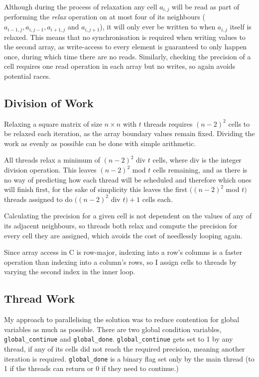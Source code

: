 \documentclass[12pt]{article}
\begin{document}
Although during the process of relaxation any cell $a_{i,j}$ will be read as part of performing the \textit{relax} operation on at most four of its neighbours ($a_{i-1,j}, a_{i,j-1}, a_{i+1, j}$ and $a_{i,j+1}$), it will only ever be written to when $a_{i,j}$ itself is relaxed. This means that no synchronisation is required when writing values to the second array, as write-access to every element is guaranteed to only happen once, during which time there are no reads. Similarly, checking the precision of a cell requires one read operation in each array but no writes, so again avoids potential races.

\subsection{Division of Work}

Relaxing a square matrix of size $n \times n$ with $t$ threads requires $(n-2)^2$ cells to be relaxed each iteration, as the array boundary values remain fixed. Dividing the work as evenly as possible can be done with simple arithmetic.

All threads relax a minimum of $(n-2)^2$ div $t$ cells, where div is the integer division operation. This leaves $(n-2)^2$ mod $t$ cells remaining, and as there is no way of predicting how each thread will be scheduled and therefore which ones will finish first, for the sake of simplicity this leaves the first $((n-2)^2$ mod $t)$ threads assigned to do $((n-2)^2$ div $t) + 1$ cells each.

Calculating the precision for a given cell is not dependent on the values of any of its adjacent neighbours, so threads both relax and compute the precision for every cell they are assigned, which avoids the cost of needlessly looping again.

Since array access in C is row-major, indexing into a row's columns is a faster operation than indexing into a column's rows, so I assign cells to threads by varying the second index in the inner loop.


\subsection{Thread Work}

My approach to parallelising the solution was to reduce contention for global variables as much as possible. There are two global condition variables, \texttt{global\_continue} and \texttt{global\_done}. \texttt{global\_continue} gets set to 1 by any thread, if any of its cells did not reach the required precision, meaning another iteration is required. \texttt{global\_done} is a binary flag set only by the main thread (to 1 if the threads can return or 0 if they need to continue.)
\end{document}

